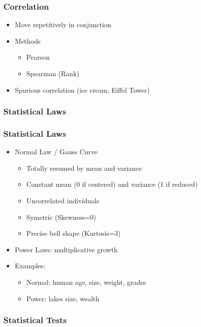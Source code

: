 \begin{frame}\frametitle{Correlation}
   \begin{itemize}
      \item Move repetitively in conjunction
      \item Methods
      \begin{itemize}
         \item Pearson
         \item Spearman (Rank)
      \end{itemize}
      \item Spurious correlation (ice cream, Eiffel Tower)
   \end{itemize}
\end{frame}



\subsubsection{Statistical Laws}

\begin{frame}\frametitle{Statistical Laws}
   \begin{itemize}
      \item Normal Law / Gauss Curve
      \begin{itemize}
         \item Totally resumed by mean and variance
         \item Constant mean (0 if centered) and variance (1 if reduced)
         \item Uncorrelated individuals
         \item Symetric (Skewness=0)
         \item Precise bell shape (Kurtosis=3)
      \end{itemize}

      \item Power Laws: multiplicative growth
      \item Examples:
      \begin{itemize}
         \item Normal: human age, size, weight, grades
         \item Power: lakes size, wealth
      \end{itemize}
   \end{itemize}
\end{frame}


\subsubsection{Statistical Tests}

